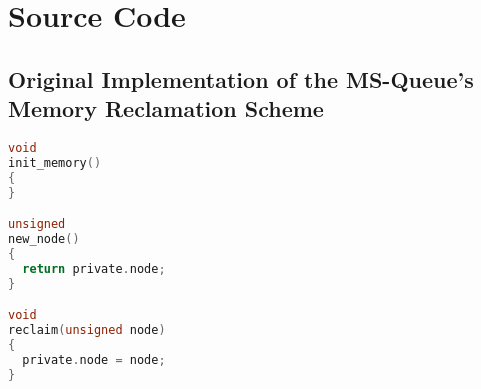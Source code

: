 \chapter{Source Code}
\section{Original Implementation of the MS-Queue's Memory Reclamation Scheme}

\begin{lstlisting}[language=C,caption={Memory management used in \citeauthor{michael1996simple}'s original implementation of the MS queue},label={lst:ms_queue_memory}]
void
init_memory()
{
}

unsigned
new_node()
{
  return private.node;
}

void
reclaim(unsigned node)
{
  private.node = node;
}
\end{lstlisting}

